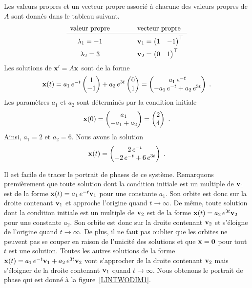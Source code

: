 {\begin{egg}
Les valeurs propres et un vecteur propre associé à chacune des valeurs
propres de $A$ sont donnés dans le tableau suivant.
\[
\begin{array}{ccl}
\text{valeur propre} & \hspace*{2em} & \text{vecteur propre} \\
\hline
\rule{0pt}{1.5em}\lambda_1 = -1 &
& \VEC{v}_1 = \begin{pmatrix} 1 & -1 \end{pmatrix}^\top \\[0.4em]
\lambda_2 = 3 & & \VEC{v}_2 = \begin{pmatrix} 0 & 1 \end{pmatrix}^\top
\end{array}
\]
Les solutions de $\mathbf{x}'= A \mathbf{x}$ sont de la forme
\[
\mathbf{x}(t) = a_1 \, e^{-t}\begin{pmatrix} 1 \\ -1 \end{pmatrix}
+ a_2 \, e^{3t} \begin{pmatrix} 0 \\ 1 \end{pmatrix}
= \begin{pmatrix}
a_1 \, e^{-t} \\ -a_1 \, e^{-t} +  a_2 \, e^{3t}
\end{pmatrix} \; .
\]
Les paramètres $a_1$ et $a_2$ sont déterminés par la condition initiale
\[
\mathbf{x}(0) = \begin{pmatrix} a_1 \\ -a_1 + a_2 \end{pmatrix}
= \begin{pmatrix} 2 \\ 4 \end{pmatrix} \ .
\]
Ainsi, $a_1=2$ et $a_2=6$.  Nous avons la solution
\[
\mathbf{x}(t) = \begin{pmatrix}
2 \, e^{-t} \\ -2 \, e^{-t} +6 \, e^{3t}
\end{pmatrix} \; .
\]

Il est facile de tracer le portrait de phases de ce système.
Remarquons premièrement que toute solution dont la condition initiale
est un multiple de $\mathbf{v}_1$ est de la forme
$\mathbf{x}(t) = a_1 \, e^{-t} \mathbf{v}_1$ pour une constante $a_1$.
Son orbite est donc sur la droite contenant $\mathbf{v}_1$ et approche
l'origine quand $t \to \infty$.  De même, toute solution dont la
condition initiale est un multiple de $\mathbf{v}_2$ est de la forme
$\mathbf{x}(t) = a_2 \, e^{3t} \mathbf{v}_2$ pour une constante $a_2$.
Son orbite est donc sur la droite contenant $\mathbf{v}_2$ et s'éloigne de
l'origine quand $t \to \infty$.  De plus, il ne faut pas oublier que les
orbites ne peuvent pas se couper en raison de l'unicité des solutions
et que $\mathbf{x} = \mathbf{0}$ pour tout $t$ est une solution.
Toutes les autres solutions de la forme
$\mathbf{x}(t) = a_1 \, e^{-t}\mathbf{v}_1 + a_2 \, e^{3t} \mathbf{v}_2$ vont
s'approcher de la droite contenant $\mathbf{v}_2$ mais s'éloigner de la
droite contenant $\mathbf{v}_1$ quand $t \to \infty$.  Nous obtenons le
portrait de phase qui est donné à la figure~\ref{LINTWODIM1}.
\label{lintwoDim1}
\end{egg}

}
